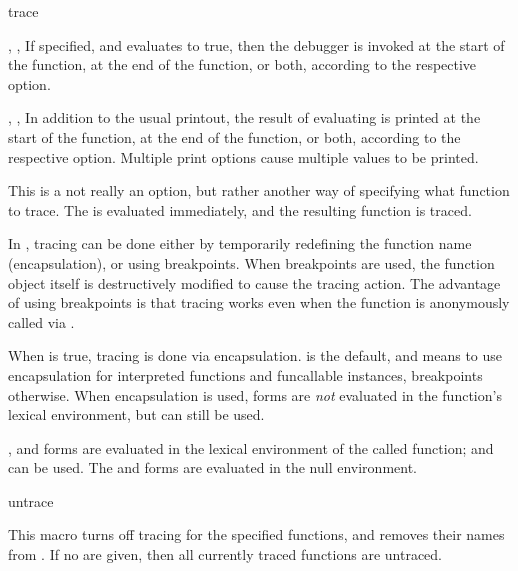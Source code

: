 \begin{defmac}{}{trace}{%
    }
\begin{Lentry}
  \item[\kwd{break} \var{form}, \kwd{break-after} \var{form},
    \kwd{break-all} \var{form}] If specified, and  evaluates
    to true, then the debugger is invoked at the start of the
    function, at the end of the function, or both, according to the
    respective option.
    
  \item[\kwd{print} \var{form}, \kwd{print-after} \var{form},
    \kwd{print-all} \var{form}] In addition to the usual printout, the
    result of evaluating  is printed at the start of the
    function, at the end of the function, or both, according to the
    respective option.  Multiple print options cause multiple values
    to be printed.
    
  \item[\kwd{function} \var{function-form}] This is a not really an
    option, but rather another way of specifying what function to
    trace.  The  is evaluated immediately, and the
    resulting function is traced.
    
  \item[\kwd{encapsulate \mgroup{:default | t | nil}}] In \cmucl,
    tracing can be done either by temporarily redefining the function
    name (encapsulation), or using breakpoints.  When breakpoints are
    used, the function object itself is destructively modified to
    cause the tracing action.  The advantage of using breakpoints is
    that tracing works even when the function is anonymously called
    via .
  
    When  is true, tracing is done via encapsulation.
     is the default, and means to use encapsulation for
    interpreted functions and funcallable instances, breakpoints
    otherwise.  When encapsulation is used, forms are {\it not}
    evaluated in the function's lexical environment, but
     can still be used.
  \end{Lentry}
  
  ,  and  forms are evaluated in
  the lexical environment of the called function;  and
   can be used.  The  and 
  forms are evaluated in the null environment.
\end{defmac}

\begin{defmac}{}{untrace}{ }
  
  This macro turns off tracing for the specified functions, and
  removes their names from .  If no
   are given, then all currently traced functions
  are untraced.
\end{defmac}

